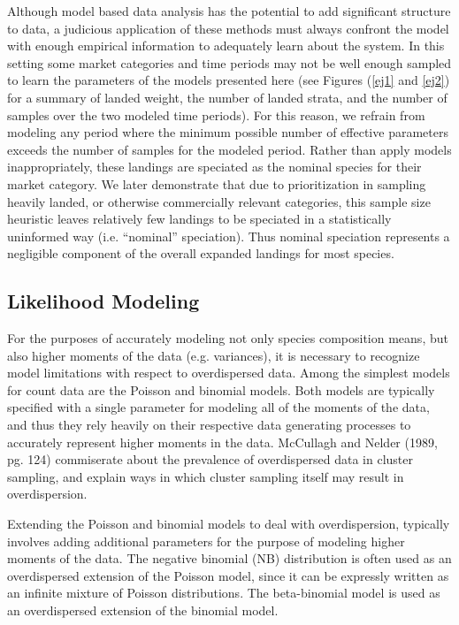 \documentclass[12pt]{article}
\begin{document}
Although model based data analysis has the potential to add significant
structure to data, a judicious application of these methods must always
confront the model with enough empirical information to adequately learn
about the system. In this setting some market categories and time
periods may not be well enough sampled to learn the parameters of the
models presented here (see Figures (\ref{ej1} and \ref{ej2}) for a summary of 
landed weight, the number of landed strata, and the number of samples over the 
two modeled time periods). For this reason, we refrain from modeling any 
period where the minimum possible number of effective parameters exceeds the 
number of samples for the modeled period. Rather than apply models 
inappropriately, these landings are speciated as the nominal species for their 
market category. We later demonstrate that due to prioritization in sampling 
heavily landed, or otherwise commercially relevant categories, this sample 
size heuristic leaves relatively few landings to be speciated in a 
statistically uninformed way (i.e.  ``nominal'' speciation). Thus nominal 
speciation represents a negligible component of the overall expanded landings 
for most species.

\subsection{Likelihood Modeling}\label{likelihoods}

For the purposes of accurately modeling not only species composition
means, but also higher moments of the data (e.g. variances), it is necessary 
to recognize model limitations with respect to overdispersed data. Among the 
simplest models for count data are the Poisson and binomial models. Both 
models are typically specified with a single parameter for modeling all of the 
moments of the data, and thus they rely heavily on their respective data 
generating processes to accurately represent higher moments in the data. 
McCullagh and Nelder (1989, pg. 124) commiserate about the prevalence of 
overdispersed data in cluster sampling, and explain ways in which cluster sampling 
itself may result in overdispersion.

Extending the Poisson and binomial models to deal with overdispersion,
typically involves adding additional parameters for the purpose of
modeling higher moments of the data. The negative binomial (NB)
distribution is often used as an overdispersed extension of the Poisson
model, since it can be expressly written as an infinite mixture of
Poisson distributions. The beta-binomial model is used as an
overdispersed extension of the binomial model.
\end{document}
